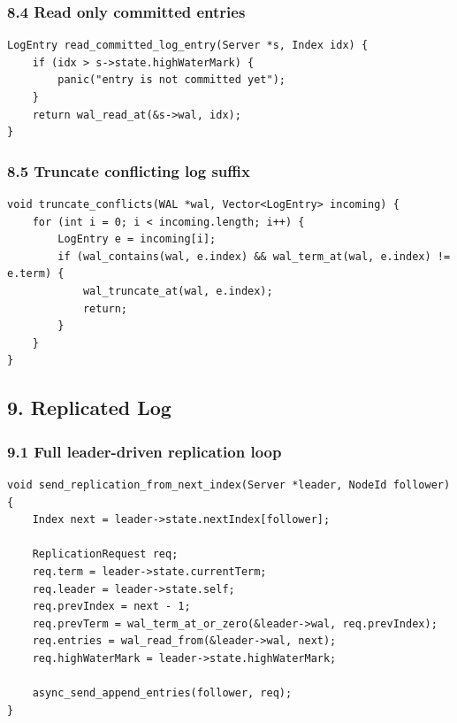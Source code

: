 \documentclass[10pt,letterpaper]{article}
\begin{document}
\subsubsection*{8.4 Read only committed entries}

\begin{verbatim}
LogEntry read_committed_log_entry(Server *s, Index idx) {
    if (idx > s->state.highWaterMark) {
        panic("entry is not committed yet");
    }
    return wal_read_at(&s->wal, idx);
}
\end{verbatim}

\subsubsection*{8.5 Truncate conflicting log suffix}

\begin{verbatim}
void truncate_conflicts(WAL *wal, Vector<LogEntry> incoming) {
    for (int i = 0; i < incoming.length; i++) {
        LogEntry e = incoming[i];
        if (wal_contains(wal, e.index) && wal_term_at(wal, e.index) != e.term) {
            wal_truncate_at(wal, e.index);
            return;
        }
    }
}
\end{verbatim}

\subsection*{9. Replicated Log}

\subsubsection*{9.1 Full leader-driven replication loop}

\begin{verbatim}
void send_replication_from_next_index(Server *leader, NodeId follower) {
    Index next = leader->state.nextIndex[follower];

    ReplicationRequest req;
    req.term = leader->state.currentTerm;
    req.leader = leader->state.self;
    req.prevIndex = next - 1;
    req.prevTerm = wal_term_at_or_zero(&leader->wal, req.prevIndex);
    req.entries = wal_read_from(&leader->wal, next);
    req.highWaterMark = leader->state.highWaterMark;

    async_send_append_entries(follower, req);
}
\end{verbatim}
\end{document}

